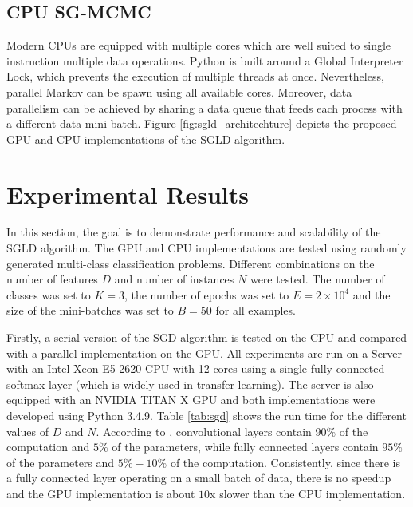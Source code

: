 \documentclass[9pt,lineno]{crone}
\begin{document}
 
\subsection{CPU SG-MCMC}
Modern CPUs are equipped with multiple cores which are well suited to single instruction multiple data operations. Python is built around a Global Interpreter Lock, which prevents the execution of multiple threads at once.  Nevertheless, parallel Markov can be spawn using all available cores.  Moreover, data parallelism can be achieved by sharing a data queue that feeds each process with a different data mini-batch.  Figure \ref{fig:sgld_architechture} depicts the proposed GPU and CPU implementations of the SGLD algorithm. 


\section{Experimental Results}
In this section, the goal is to demonstrate performance and scalability of the SGLD algorithm. The GPU and CPU implementations are tested using randomly generated multi-class classification problems. Different combinations on the number of features $D$ and number of instances $N$ were tested. The number of classes was set to $K=3$, the number of epochs was set to $E=2 \times 10^4$ and the size of the mini-batches was set to $B=50$ for all examples.

Firstly, a serial version  of the SGD algorithm is tested on the CPU and compared with a parallel implementation on the GPU. All experiments are run on a Server with an Intel Xeon E5-2620 CPU with 12 cores using a single fully connected softmax layer (which is widely used in transfer learning). The server is also equipped with an NVIDIA TITAN X GPU and both implementations were developed using Python 3.4.9. Table \ref{tab:sgd} shows the run time for the different values of $D$ and $N$. According to \cite{LI201695}, convolutional layers contain $90\%$ of the computation and $5\%$ of the parameters, while fully connected layers contain $95\%$ of the parameters and $5\%-10\%$ of the computation. Consistently, since there is a fully connected layer operating on a small batch of data, there is no speedup and the GPU implementation is about $10$x slower than the CPU implementation.
\end{document}
